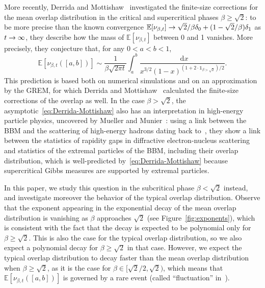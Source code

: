\documentclass[10pt]{amsart}
\theoremstyle{definition}\newtheorem{defi}[theo]{Definition}\newtheorem{rema}[theo]{Remark}\newtheorem{exam}[theo]{Example}\newtheorem{exem}[theo]{Example}\newtheorem{nota}[theo]{Notation}
\renewcommand{\d}[1]{\mathop{}\!\mathrm{d}#1}
\newcommand{\E}{\mathbb{E}}
\newcommand\1{\mathds{1}}
\renewcommand*{\to}{\mathchoice{\longrightarrow}{\rightarrow}{\rightarrow}{\rightarrow}}
\begin{document}
More recently, Derrida and Mottishaw~\cite{DerridaMottishaw2016} investigated the finite-size corrections for the mean overlap distribution in the critical and supercritical phases $\beta \geq \sqrt{2}$: to be more precise than the known convergence $\E[\nu_{\beta,t}] \to \sqrt{2}/\beta \delta_0 + (1-\sqrt{2}/\beta) \delta_1$ as $t \to\infty$, they describe how the mass of $\E[\nu_{\beta,t}]$ between 0 and 1 vanishes. More precisely, they conjecture that, for any $0<a<b<1$,
\begin{equation}\label{eq:Derrida-Mottishaw}
\E[\nu_{\beta,t}([a,b])]
\sim \frac{1}{\beta \sqrt{2 \pi t}} \int_a^b \frac{\d{x}}{x^{3/2} (1-x)^{(1+2\cdot \1_{\beta>\sqrt{2}})/2}}.
\end{equation}
This prediction is based both on numerical simulations and on an approximation by the GREM, for which Derrida and Mottishaw~\cite{DerridaMottishaw2018} calculated the finite-size corrections of the overlap as well. In the case $\beta>\sqrt{2}$, the asymptotic~\eqref{eq:Derrida-Mottishaw} also has an interpretation in high-energy particle physics, uncovered by Mueller and Munier~\cite{MuellerMunier2018a,MuellerMunier2018b}: using a link between the BBM and the scattering of high-energy hadrons dating back to~\cite{IancuMuellerMunier2005}, they show a link between the statistics of rapidity gaps in diffractive electron-nucleus scattering and statistics of the extremal particles of the BBM, including their overlap distribution, which is well-predicted by~\eqref{eq:Derrida-Mottishaw} because supercritical Gibbs measures are supported by extremal particles.


In this paper, we study this question in the subcritical phase $\beta < \sqrt{2}$ instead, and investigate moreover the behavior of the typical overlap distribution. Observe that the exponent appearing in the exponential decay of the mean overlap distribution is vanishing as $\beta$ approaches $\sqrt{2}$ (see Figure~\ref{fig:exponents}), which is consistent with the fact that the decay is expected to be polynomial only for $\beta \geq \sqrt{2}$. This is also the case for the typical overlap distribution, so we also expect a polynomial decay for $\beta \geq \sqrt{2}$ in that case. However, we expect the typical overlap distribution to decay faster than the mean overlap distribution when $\beta \geq \sqrt{2}$, as it is the case for $\beta \in [\sqrt{2}/2,\sqrt{2})$, which means that $\E[\nu_{\beta,t}([a,b])]$ is governed by a rare event (called ``fluctuation'' in~\cite{MuellerMunier2018a}).
\end{document}

